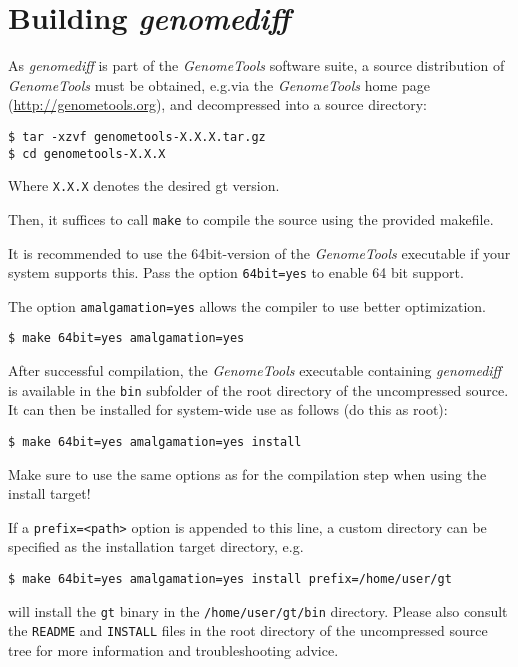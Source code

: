 \documentclass[12pt,titlepage]{article}
\newcommand{\Gdiff}{\textit{genomediff}\xspace}
\newcommand{\GenomeTools}{\textit{GenomeTools}\xspace}
\newcommand{\Gt}{\texttt{gt}\xspace}
\newcommand{\File}[1]{\texttt{\small #1}}
\begin{document}
\section{Building \Gdiff} \label{Building}
As \Gdiff is part of the \GenomeTools software suite, a source distribution of
\GenomeTools must be obtained, e.g.\@ via the \GenomeTools home page
(\url{http://genometools.org}), and decompressed into a source directory:

\begin{lstlisting}
$ tar -xzvf genometools-X.X.X.tar.gz
$ cd genometools-X.X.X
\end{lstlisting}

Where \lstinline!X.X.X! denotes the desired gt version.

Then, it suffices to call \lstinline!make! to compile the source using the
provided makefile.

It is recommended to use the 64bit-version of the \GenomeTools executable if
your system supports this. Pass the option \lstinline!64bit=yes! to enable 64
bit support.

The option \lstinline!amalgamation=yes! allows the compiler to use better
optimization.

\begin{lstlisting}
$ make 64bit=yes amalgamation=yes
\end{lstlisting}

After successful compilation, the \GenomeTools executable containing \Gdiff is
available in the \File{bin} subfolder of the root directory of the uncompressed
source. It can then be installed for system-wide use as follows (do this as
root):

\begin{lstlisting}
$ make 64bit=yes amalgamation=yes install
\end{lstlisting}

Make sure to use the same options as for the compilation step when using the
install target!

If a \texttt{prefix=<path>} option is appended to this line, a custom directory
can be specified as the installation target directory, e.g.\@

\begin{lstlisting}
$ make 64bit=yes amalgamation=yes install prefix=/home/user/gt
\end{lstlisting}

will install the \Gt binary in the \File{/home/user/gt/bin} directory. Please
also consult the \File{README} and \File{INSTALL} files in the root directory of
the uncompressed source tree for more information and troubleshooting advice.
\end{document}
